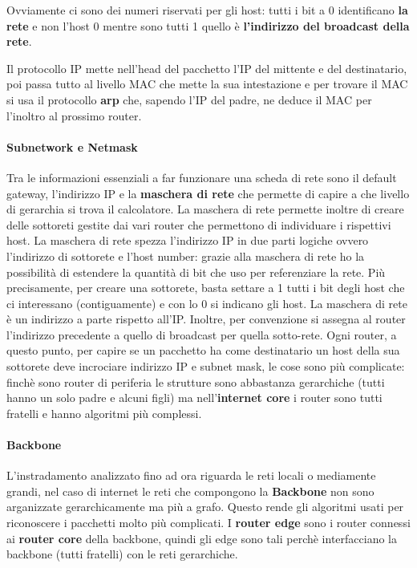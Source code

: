 \documentclass{article}
\begin{document}
Ovviamente ci sono dei numeri riservati per gli host: tutti i bit a 0
identificano \textbf{la rete} e non l'host 0 mentre sono tutti 1 quello è
\textbf{l'indirizzo del broadcast della rete}.

Il protocollo IP mette nell'head del pacchetto l'IP del mittente e del
destinatario, poi passa tutto al livello MAC che mette la sua intestazione e
per trovare il MAC si usa il protocollo \textbf{arp} che, sapendo l'IP del
padre, ne deduce il MAC per l'inoltro al prossimo router.

\paragraph{Subnetwork e Netmask}
Tra le informazioni essenziali a far funzionare una scheda di rete sono il
default gateway, l'indirizzo IP e la \textbf{maschera di rete} che permette di
capire a che livello di gerarchia si trova il calcolatore. La maschera di rete
permette inoltre di creare delle sottoreti gestite dai vari router che
permettono di individuare i rispettivi host. La maschera di rete spezza
l'indirizzo IP in due parti logiche ovvero l'indirizzo di sottorete e l'host
number: grazie alla maschera di rete ho la possibilità di estendere la quantità
di bit che uso per referenziare la rete. Più precisamente, per creare una
sottorete, basta settare a 1 tutti i bit degli host che ci interessano
(contiguamente) e con lo 0 si indicano gli host. La maschera di rete è un
indirizzo a parte rispetto all'IP. Inoltre, per convenzione si assegna al
router l'indirizzo precedente a quello di broadcast per quella sotto-rete. Ogni
router, a questo punto, per capire se un pacchetto ha come destinatario un host
della sua sottorete deve incrociare indirizzo IP e subnet mask, le cose sono
più complicate: finchè sono router di periferia le strutture sono abbastanza
gerarchiche (tutti hanno un solo padre e alcuni figli) ma nell'\textbf{internet
    core} i router sono tutti fratelli e hanno algoritmi più complessi.

\paragraph{Backbone}
L'instradamento analizzato fino ad ora riguarda le reti locali o mediamente
grandi, nel caso di internet le reti che compongono la \textbf{Backbone} non
sono arganizzate gerarchicamente ma più a grafo. Questo rende gli algoritmi
usati per riconoscere i pacchetti molto più complicati. I \textbf{router edge}
sono i router connessi ai \textbf{router core} della backbone, quindi gli edge
sono tali perchè interfacciano la backbone (tutti fratelli) con le reti
gerarchiche.
\end{document}
